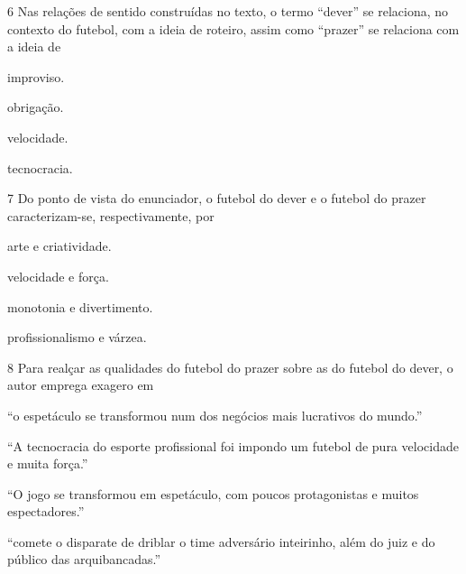 \pagebreak

\num{6} Nas relações de sentido construídas no texto, o termo ``dever'' se
relaciona, no contexto do futebol, com a ideia de roteiro, assim como
``prazer'' se relaciona com a ideia de

\begin{multicols}{2}
\begin{escolha}
\item improviso.

\item obrigação.

\item velocidade.

\item tecnocracia.
\end{escolha}
\end{multicols}

\num{7} Do ponto de vista do enunciador, o futebol do dever e o futebol do prazer
caracterizam-se, respectivamente, por

\begin{multicols}{2}
\begin{escolha}
\item arte e criatividade.

\item velocidade e força.

\item monotonia e divertimento.

\item profissionalismo e várzea.
\end{escolha}
\end{multicols}

\num{8} Para realçar as qualidades do futebol do prazer sobre as do futebol do
dever, o autor emprega exagero em

\begin{escolha}
\item ``o espetáculo se transformou num dos negócios mais lucrativos do
mundo.''

\item ``A tecnocracia do esporte profissional foi impondo um futebol de
pura velocidade e muita força.''

\item ``O jogo se transformou em espetáculo, com poucos protagonistas e muitos espectadores.''

\item ``comete o disparate de driblar o time adversário inteirinho, além do juiz e do público das arquibancadas.''
\end{escolha}

